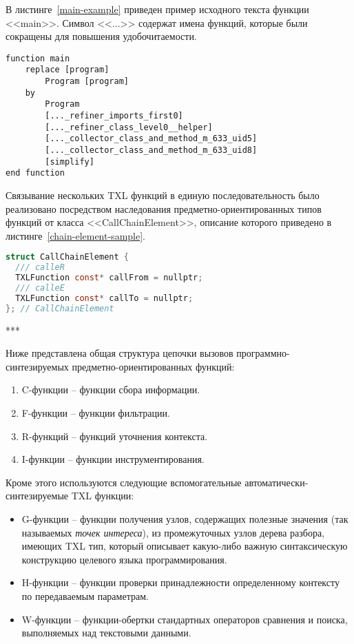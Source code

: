 В листинге~\ref{main-example} приведен пример исходного текста функции <<main>>.
Символ <<...>> содержат имена функций, которые были сокращены для повышения удобочитаемости.

\begin{lstlisting}[frame=single, language=TXL, label={main-example}, caption={Пример исходного текста главной функции}]
function main
	replace [program]
		Program [program]
	by
		Program
		[..._refiner_imports_first0]
		[..._refiner_class_level0__helper]
		[..._collector_class_and_method_m_633_uid5]
		[..._collector_class_and_method_m_633_uid8]
		[simplify]
end function
\end{lstlisting}

Связывание нескольких TXL функций в единую последовательность было реализовано посредством наследования предметно-ориентированных типов функций от класса <<CallChainElement>>, описание которого приведено в листинге~\ref{chain-element-sample}.

\begin{lstlisting}[frame=single, language=C, label={chain-element-sample}, caption={Исходный код определения элемента цепочки вызовов}]
struct CallChainElement {
  /// calleR
  TXLFunction const* callFrom = nullptr;
  /// calleE
  TXLFunction const* callTo = nullptr;
}; // CallChainElement
\end{lstlisting}

***

Ниже представлена общая структура цепочки вызовов программно-синтезируемых предметно-ориентированных функций:
\begin{enumerate}[noitemsep]
  \item C-функции -- функции сбора информации.
  \item F-функции -- функции фильтрации.
  \item R-функций -- функций уточнения контекста.
  \item I-функции -- функции инструментирования.
\end{enumerate}

Кроме этого используются следующие вспомогательные автоматически-синтезируемые TXL функции:
\begin{itemize}
  \item G-функции -- функции получения узлов, содержащих полезные значения (так называемых \textit{точек интереса}), из промежуточных узлов дерева разбора, имеющих TXL тип, который описывает какую-либо важную синтаксическую конструкцию целевого языка программирования.
  \item H-функции -- функции проверки принадлежности определенному контексту по передаваемым параметрам.
  \item W-функции -- функции-обертки стандартных операторов сравнения и поиска, выполняемых над текстовыми данными.
\end{itemize}


